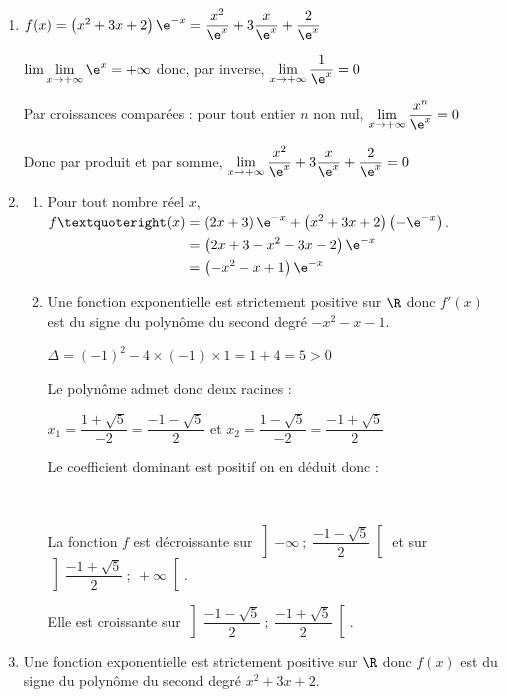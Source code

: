 \begin{enumerate}
\item $f(x)=\left(x^{2}+3 x+2\right) \e^{-x} = \dfrac{x^2}{\e^x}+3 \dfrac{x}{\e^x} + \dfrac{2}{\e^x}$

$\lim\lim\limits_{x\to +\infty }\e^x= +\infty$ donc, par inverse, $\lim\limits_{x\to +\infty }\dfrac{1}{\e^x}=0$

Par croissances comparées : pour tout entier $n$ non nul, $\lim\limits_{x\to +\infty} \dfrac{x^n}{\e^x}= 0$
		
Donc par produit et par somme, $\lim\limits_{x \to +\infty} \dfrac{x^2}{\e^x}+3 \dfrac{x}{\e^x} + \dfrac{2}{\e^x} = 0$
\item 
	\begin{enumerate}
		\item Pour tout nombre réel $x$, 
$\begin{aligned}[t] f’(x)& =\left(2x+3\right) \e^{-x} + \left(x^2+3x+2\right)\left(-\e^{-x}\right)\\
	& = \left( 2x+3-x^2-3x-2\right)\e^{-x}\\
	& = \left(-x^2-x+1\right)\e^{-x}
\end{aligned}$.
\item Une fonction exponentielle est strictement positive sur $\R$ donc $f'(x)$ est du signe du polynôme du second degré $-x^2-x-1$. 

$\Delta=(-1)^2-4 \times (-1)\times 1= 1+4=5>0$

Le polynôme admet donc deux racines : 

$x_1= \dfrac{1+\sqrt{5}}{-2}= \dfrac{-1-\sqrt{5}}{2}$ \quad et \quad $x_2= \dfrac{1-\sqrt{5}}{-2}= \dfrac{-1+\sqrt{5}}{2}$

Le coefficient dominant est positif on en déduit donc :




\hfill~

La fonction $f$ est décroissante sur $\left] -\infty~;~\dfrac{-1-\sqrt{5}}{2}\right[$ et sur $\left] \dfrac{-1+\sqrt{5}}{2}~;~ +\infty \right[$.

Elle est croissante sur $\left]\dfrac{-1-\sqrt{5}}{2}~;~\dfrac{-1+\sqrt{5}}{2}\right[$.
	\end{enumerate}
\item Une fonction exponentielle est strictement positive sur $\R$ donc $f(x)$ est du signe du polynôme du second degré $x^2 + 3x + 2$.


\end{enumerate}

